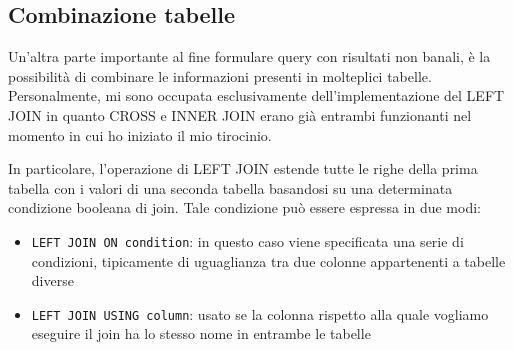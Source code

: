 \subsection{Combinazione tabelle}
Un'altra parte importante al fine formulare query con risultati non banali, è la possibilità di combinare le informazioni presenti in molteplici tabelle. Personalmente, mi sono occupata
esclusivamente dell'implementazione del LEFT JOIN in quanto CROSS e INNER JOIN erano già entrambi funzionanti nel momento in cui ho iniziato il mio tirocinio.

In particolare, l'operazione di LEFT JOIN estende tutte le righe della prima tabella con i valori di una seconda tabella basandosi su una determinata condizione booleana di join. Tale condizione
può essere espressa in due modi:
\begin{itemize}
    \item \verb+LEFT JOIN ON condition+: in questo caso viene specificata una serie di condizioni, tipicamente di uguaglianza tra due colonne appartenenti a tabelle diverse  
    \item \verb+LEFT JOIN USING column+: usato se la colonna rispetto alla quale vogliamo eseguire il join ha lo stesso nome in entrambe le tabelle
\end{itemize}

